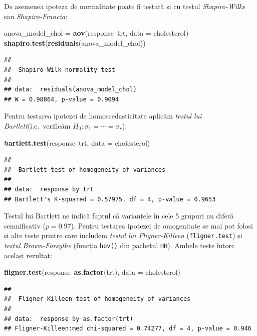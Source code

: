 \documentclass[]{article}
\newenvironment{Shaded}{\begin{snugshade}}{\end{snugshade}}
\newcommand{\KeywordTok}[1]{\textcolor[rgb]{0.13,0.29,0.53}{\textbf{{#1}}}}
\newcommand{\DataTypeTok}[1]{\textcolor[rgb]{0.13,0.29,0.53}{{#1}}}
\newcommand{\StringTok}[1]{\textcolor[rgb]{0.31,0.60,0.02}{{#1}}}
\newcommand{\NormalTok}[1]{{#1}}
\begin{document}
De asemenea ipoteza de normalitate poate fi testată și cu testul
\emph{Shapiro-Wilks} sau \emph{Shapiro-Francia}:

\begin{Shaded}
\begin{Highlighting}[]
\NormalTok{anova_model_chol =}\StringTok{ }\KeywordTok{aov}\NormalTok{(response~trt, }\DataTypeTok{data =} \NormalTok{cholesterol)}
\KeywordTok{shapiro.test}\NormalTok{(}\KeywordTok{residuals}\NormalTok{(anova_model_chol))}
\end{Highlighting}
\end{Shaded}

\begin{verbatim}
## 
##  Shapiro-Wilk normality test
## 
## data:  residuals(anova_model_chol)
## W = 0.98864, p-value = 0.9094
\end{verbatim}

Pentru testarea ipotezei de homoscedasticitate aplicăm \emph{testul lui
Bartlett}(i.e.~verificăm \(H_0: \sigma_1=\cdots=\sigma_r\)):

\begin{Shaded}
\begin{Highlighting}[]
\KeywordTok{bartlett.test}\NormalTok{(response~trt, }\DataTypeTok{data =} \NormalTok{cholesterol)}
\end{Highlighting}
\end{Shaded}

\begin{verbatim}
## 
##  Bartlett test of homogeneity of variances
## 
## data:  response by trt
## Bartlett's K-squared = 0.57975, df = 4, p-value = 0.9653
\end{verbatim}

Testul lui Bartlett ne indică faptul că varianțele în cele 5 grupuri nu
diferă semnificativ (\(p = 0.97\)). Pentru testarea ipotezei de
omogenitate se mai pot folosi și alte teste printre care includem
\emph{testul lui Fligner-Killeen} (\texttt{fligner.test}) și
\emph{testul Brown-Forsythe} (funcția \texttt{hov()} din pachetul
\texttt{HH}). Ambele teste întorc același rezultat:

\begin{Shaded}
\begin{Highlighting}[]
\KeywordTok{fligner.test}\NormalTok{(response~}\KeywordTok{as.factor}\NormalTok{(trt), }\DataTypeTok{data =} \NormalTok{cholesterol)}
\end{Highlighting}
\end{Shaded}

\begin{verbatim}
## 
##  Fligner-Killeen test of homogeneity of variances
## 
## data:  response by as.factor(trt)
## Fligner-Killeen:med chi-squared = 0.74277, df = 4, p-value = 0.946
\end{verbatim}
\end{document}
